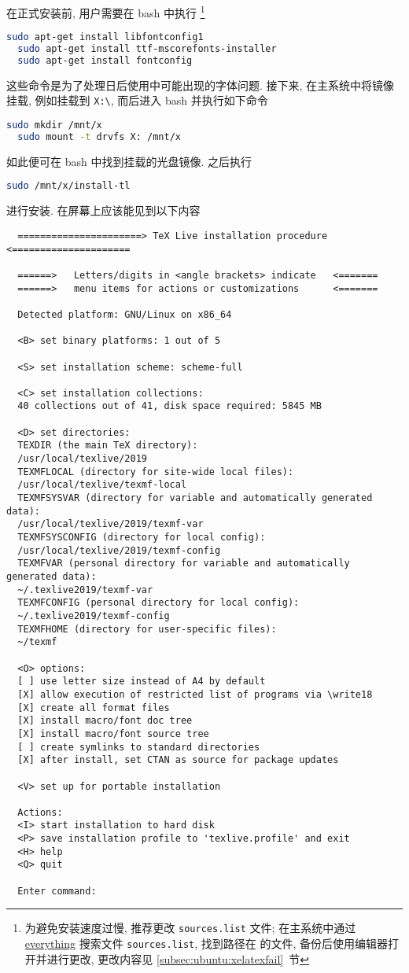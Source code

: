 在正式安装前,
用户需要在 \textsf{bash} 中执行%
\footnote{为避免安装速度过慢, 推荐更改 \texttt{sources.list} 文件;
在主系统中通过 \href{https://www.voidtools.com/zh-cn/}{everything}
搜索文件 \texttt{sources.list},
找到路径在  的文件,
备份后使用编辑器打开并进行更改,
更改内容见 \ref{subsec:ubuntu:xelatexfail}~节} 
\begin{lstlisting}[language=bash]
  sudo apt-get install libfontconfig1
  sudo apt-get install ttf-mscorefonts-installer
  sudo apt-get install fontconfig
\end{lstlisting}
这些命令是为了处理日后使用中可能出现的字体问题.
接下来, 在主系统中将镜像挂载,
例如挂载到 \texttt{X:\textbackslash},
而后进入 \textsf{bash} 并执行如下命令
\begin{lstlisting}[language = bash]
  sudo mkdir /mnt/x
  sudo mount -t drvfs X: /mnt/x
\end{lstlisting}
如此便可在 \textsf{bash} 中找到挂载的光盘镜像.
之后执行
\begin{lstlisting}[language = bash]
  sudo /mnt/x/install-tl
\end{lstlisting}
进行安装.
在屏幕上应该能见到以下内容
\begin{lstlisting}
  ======================> TeX Live installation procedure <=====================

  ======>   Letters/digits in <angle brackets> indicate   <=======
  ======>   menu items for actions or customizations      <=======
  
  Detected platform: GNU/Linux on x86_64
  
  <B> set binary platforms: 1 out of 5
  
  <S> set installation scheme: scheme-full
  
  <C> set installation collections:
  40 collections out of 41, disk space required: 5845 MB
  
  <D> set directories:
  TEXDIR (the main TeX directory):
  /usr/local/texlive/2019
  TEXMFLOCAL (directory for site-wide local files):
  /usr/local/texlive/texmf-local
  TEXMFSYSVAR (directory for variable and automatically generated data):
  /usr/local/texlive/2019/texmf-var
  TEXMFSYSCONFIG (directory for local config):
  /usr/local/texlive/2019/texmf-config
  TEXMFVAR (personal directory for variable and automatically generated data):
  ~/.texlive2019/texmf-var
  TEXMFCONFIG (personal directory for local config):
  ~/.texlive2019/texmf-config
  TEXMFHOME (directory for user-specific files):
  ~/texmf

  <O> options:
  [ ] use letter size instead of A4 by default
  [X] allow execution of restricted list of programs via \write18
  [X] create all format files
  [X] install macro/font doc tree
  [X] install macro/font source tree
  [ ] create symlinks to standard directories
  [X] after install, set CTAN as source for package updates
  
  <V> set up for portable installation
  
  Actions:
  <I> start installation to hard disk
  <P> save installation profile to 'texlive.profile' and exit
  <H> help
  <Q> quit
  
  Enter command: 
\end{lstlisting}
